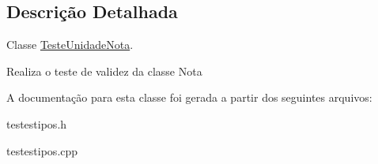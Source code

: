 \subsection{\-Descrição \-Detalhada}
\-Classe \hyperlink{class_teste_unidade_nota}{\-Teste\-Unidade\-Nota}. 

\-Realiza o teste de validez da classe \-Nota 

\-A documentação para esta classe foi gerada a partir dos seguintes arquivos\-:\begin{DoxyCompactItemize}
\item 
testestipos.\-h\item 
testestipos.\-cpp\end{DoxyCompactItemize}

